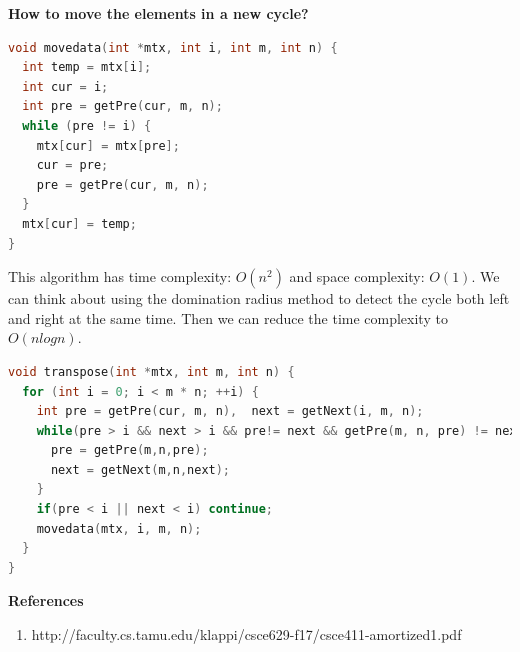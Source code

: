 \begin{homeworkProblem}
\textbf{How to move the elements in a new cycle?}

\begin{lstlisting}[language=C++]
void movedata(int *mtx, int i, int m, int n) {
  int temp = mtx[i];
  int cur = i;
  int pre = getPre(cur, m, n);
  while (pre != i) {
    mtx[cur] = mtx[pre];
    cur = pre;
    pre = getPre(cur, m, n);
  }
  mtx[cur] = temp;
}
\end{lstlisting}

This algorithm has time complexity: $O(n^2)$ and space complexity: $O(1)$. We can think about using the domination radius method to detect the cycle both left and right at the same time. Then we can reduce the time complexity to $O(n log n)$.

\begin{lstlisting}[language=C++]
void transpose(int *mtx, int m, int n) {
  for (int i = 0; i < m * n; ++i) {
    int pre = getPre(cur, m, n),  next = getNext(i, m, n);
    while(pre > i && next > i && pre!= next && getPre(m, n, pre) != next) {
      pre = getPre(m,n,pre);
      next = getNext(m,n,next); 
    }
    if(pre < i || next < i) continue;
    movedata(mtx, i, m, n);
  }
}
\end{lstlisting}

\end{homeworkProblem}

\pagebreak
\textbf{References}
    \begin{enumerate}
        \item http://faculty.cs.tamu.edu/klappi/csce629-f17/csce411-amortized1.pdf
    \end{enumerate}
